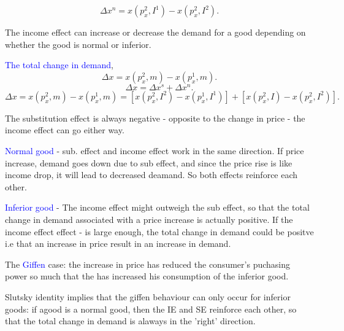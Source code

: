 \documentclass{tufte-handout}
\begin{document}
\[
\Delta x^n = x(p_x^2,I^1) - x(p_x^2,I^2)
.\] 

The income effect can increase or decrease the demand for a good depending on whether the good is normal or inferior.
   




\textcolor{blue}{The total change in demand},
\[ \Delta x = x(p_x^2,m) - x(p_x^1, m) .\]
\[ \Delta x = \Delta x^s + \Delta x^n  .\] 
\[ \Delta x =  x(p_x^2,m) - x(p_x^1, m)   =   [x(p_x^2,I^2) - x(p_x^1,I^1)] + [x(p_x^2,I) - x(p_x^2,I^2)] .\]
\marginnote{ \textcolor{blue}{Slutsky Identity}}

The substitution effect is always negative - opposite to the change in price - the income effect can go either way.





\textbullet \textcolor{blue}{Normal good} - sub. effect and income effect work in the same direction. If price increase, demand goes down due to sub effect, and since the price rise is like income drop, it will lead to decreased deamand. So both effects reinforce each other. 



\textbullet \textcolor{blue}{Inferior good} - The income effect might outweigh   the sub effect, so that the total change in demand associated with a price increase is actually positive.  If the income effect effect - is large enough, the total change in demand could be positve i.e that an increase in price result in an increase in demand. 

The \textcolor{blue}{Giffen} case: the increase in price has reduced the consumer's puchasing power so much that the has increased his consumption of the inferior good.

Slutsky identity implies that the giffen behaviour can only occur for inferior goods: if agood is a normal good, then the IE and SE reinforce each other, so that the total change in demand is alaways in the 'right' direction.


\end{document}
